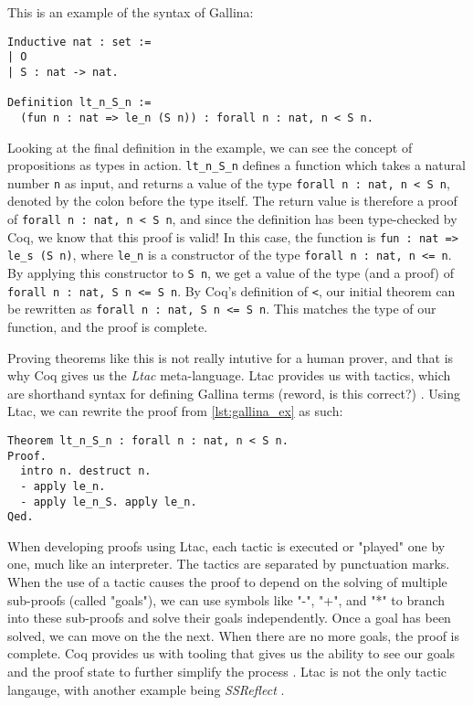 This is an example of the syntax of Gallina:

\begin{minipage}{\linewidth}
\begin{lstlisting}[language=Coq, label={lst:gallina_ex}, caption={Example of Gallina syntax}]
Inductive nat : set :=
| O
| S : nat -> nat.

Definition lt_n_S_n :=
  (fun n : nat => le_n (S n)) : forall n : nat, n < S n.
\end{lstlisting}
\end{minipage}

Looking at the final definition in the example, we can see the
concept of propositions as types in action.
\lstinline{lt_n_S_n} defines a function which takes a natural number \lstinline{n}
as input, and returns a value of the type \lstinline{forall n : nat, n < S n},
denoted by the colon before the type itself.
The return value is therefore a proof of \lstinline{forall n : nat, n < S n}, and since
the definition has been type-checked by Coq, we know that this proof is valid!
In this case, the function is
\lstinline{fun : nat => le_s (S n)}, where \lstinline{le_n} is a constructor
of the type \lstinline{forall n : nat, n <= n}. By applying this constructor
to \lstinline{S n}, we get a value of the type (and a proof) of
\lstinline{forall n : nat, S n <= S n}. By Coq's definition of \lstinline{<},
our initial theorem can be rewritten as \lstinline{forall n : nat, S n <= S n}.
This matches the type of our function, and the proof is complete.

Proving theorems like this is not really intutive for a human prover,
and that is why Coq gives us the \textit{Ltac} meta-language.
Ltac provides us with tactics, which are shorthand syntax for defining Gallina terms (reword, is this correct?) \cite{cltac}.
Using Ltac, we can rewrite the proof from \ref{lst:gallina_ex} as such:

\begin{minipage}{\linewidth}
\begin{lstlisting}[language=Coq, label={lst:ltac_ex}, caption={Example of Ltac syntax}]
Theorem lt_n_S_n : forall n : nat, n < S n.
Proof.
  intro n. destruct n.
  - apply le_n.
  - apply le_n_S. apply le_n.
Qed.
\end{lstlisting}
\end{minipage}

When developing proofs using Ltac, each tactic is executed or "played" one by one,
much like an interpreter. The tactics are separated by punctuation marks.
When the use of a tactic causes the proof to depend on the solving of multiple sub-proofs (called "goals"),
we can use symbols like "-", "+", and "*" to branch into these sub-proofs and solve their goals independently.
Once a goal has been solved, we can move on the the next. When there are no more goals, the proof is complete.
Coq provides us with tooling that gives us the ability to see our goals and the proof state
to further simplify the process \cite{cide}.
Ltac is not the only tactic langauge, with another example being \textit{SSReflect} \cite{cssr}.


